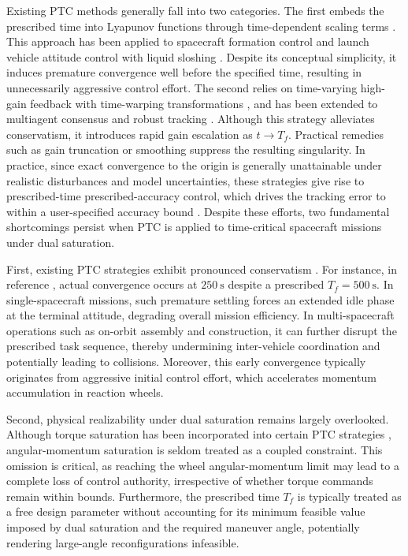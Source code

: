 \documentclass[journal]{new-aiaa}
\begin{document}
Existing PTC methods generally fall into two categories. The first embeds the prescribed time 
into Lyapunov functions through time-dependent scaling terms 
\cite{sanchez-torres_class_2018,xiao_predefined-time_2025, das_predefined-time_2024}. 
This approach has been applied to spacecraft 
formation control \cite{xu_distributed_2024} and launch vehicle attitude control with liquid 
sloshing \cite{meng_predefined-time_2025}. 
Despite its conceptual simplicity, it induces premature convergence well before the 
specified time, resulting in unnecessarily aggressive control effort. The second relies on 
time-varying high-gain feedback with time-warping transformations 
\cite{song_time-varying_2017,zhou_finite-time_2020}, 
and has been extended to multiagent consensus and robust tracking 
\cite{wang_prescribed-time_2019,cao_practical_2022,xiao_scaling_2025}. Although this strategy 
alleviates conservatism, it introduces rapid gain escalation as $t\to T_f$. Practical remedies 
such as gain truncation or smoothing suppress the resulting singularity. 
In practice, since exact convergence to the origin is generally unattainable under realistic 
disturbances and model uncertainties, these strategies give rise to 
prescribed-time prescribed-accuracy control, which drives the tracking error to 
within a user-specified accuracy bound 
\cite{xiao_scaling_2025,ye_predefined-time_2022,xiao_quantitative_2025}. 
Despite these efforts, two fundamental shortcomings persist when PTC is applied 
to time-critical spacecraft missions under dual saturation.

First, existing PTC strategies exhibit pronounced conservatism 
\cite{cao_practical_2022,song_time-varying_2017,xu_distributed_2024}. 
For instance, in reference \cite{xu_distributed_2024}, actual convergence occurs at $250~\mathrm{s}$ 
despite a prescribed $T_f=500~\mathrm{s}$. In single-spacecraft missions, such premature 
settling forces an extended idle phase at the terminal attitude, degrading overall mission 
efficiency. In multi-spacecraft operations such as on-orbit assembly and construction, it can further disrupt the 
prescribed task sequence, thereby undermining inter-vehicle coordination and potentially leading to collisions.
Moreover, this early convergence typically originates from aggressive 
initial control effort, which accelerates momentum accumulation in reaction wheels.

Second, physical realizability under dual saturation remains largely overlooked. 
Although torque saturation has been incorporated into certain PTC strategies 
\cite{sun_attitude_2024,xu_distributed_2022,zhao_exponential_2024}, angular-momentum saturation is 
seldom treated as a coupled constraint. This omission is critical, as reaching the wheel 
angular-momentum limit may lead to a complete loss of control authority, irrespective of whether torque 
commands remain within bounds. Furthermore, the prescribed time $T_f$ is typically treated as a free design 
parameter without accounting for its minimum feasible value imposed by dual saturation 
and the required maneuver angle, potentially rendering large-angle reconfigurations infeasible.
\end{document}
